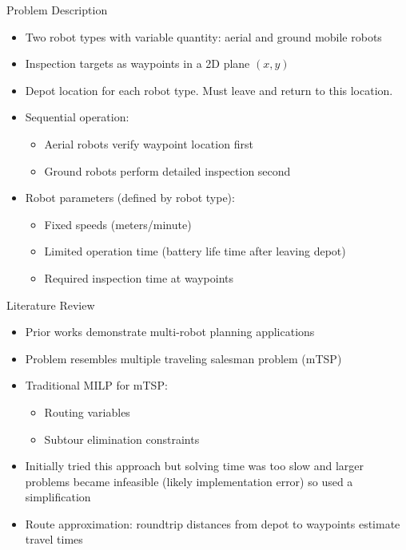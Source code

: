 \documentclass[aspectratio=169,11pt,xcolor={dvipsnames},hyperref={pdftex,pdfpagemode=UseNone,hidelinks,pdfdisplaydoctitle=true},usepdftitle=false]{beamer}
\begin{document}
    \begin{frame}{Problem Description}
      \begin{itemize}
        \item Two robot types with variable quantity: aerial and ground mobile robots
        \item Inspection targets as waypoints in a 2D plane $(x,y)$
        \item Depot location for each robot type. Must leave and return to this location.
        \item Sequential operation:
          \begin{itemize}
            \item Aerial robots verify waypoint location first
            \item Ground robots perform detailed inspection second
          \end{itemize}
        \item Robot parameters (defined by robot type):
          \begin{itemize}
            \item Fixed speeds (meters/minute)
            \item Limited operation time (battery life time after leaving depot)
            \item Required inspection time at waypoints
          \end{itemize}
      \end{itemize}
    \end{frame}

    \begin{frame}{Literature Review}
      \begin{itemize}
        \item Prior works demonstrate multi-robot planning applications
        \item Problem resembles multiple traveling salesman problem (mTSP)
        \item Traditional MILP for mTSP:
          \begin{itemize}
            \item Routing variables 
            \item Subtour elimination constraints
          \end{itemize}
        \item Initially tried this approach but solving time was too slow and larger problems became infeasible (likely implementation error) so used a simplification
        \item Route approximation: roundtrip distances from depot to waypoints estimate travel times
      \end{itemize}
    \end{frame}
\end{document}
